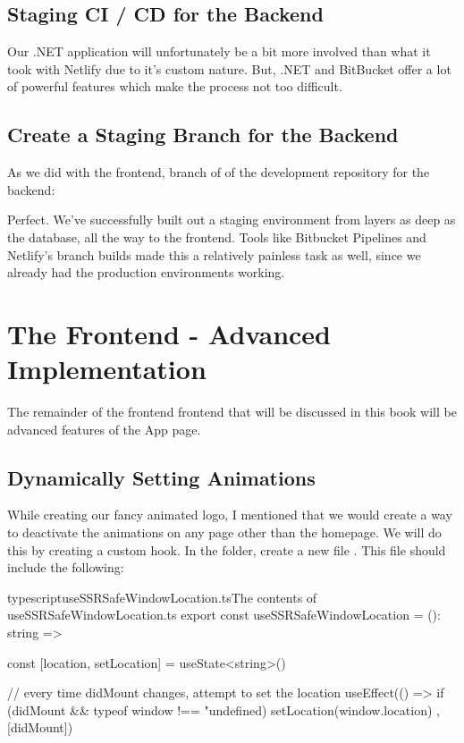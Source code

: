 \documentclass[paper=6in:9in,pagesize=pdftex,headinclude=on,footinclude=on,12pt]{scrbook}
\begin{document}
\section{Staging CI / CD for the Backend}

Our .NET application will unfortunately be a bit more involved than what it took with Netlify due to it's custom nature. But, .NET and BitBucket offer a lot of powerful features which make the process not too difficult.

\section{Create a Staging Branch for the Backend}

As we did with the frontend, branch of of the development repository for the backend:


Perfect. We've successfully built out a staging environment from layers as deep as the database, all the way to the frontend. Tools like Bitbucket Pipelines and Netlify's branch builds made this a relatively painless task as well, since we already had the production environments working.

\chapter{The Frontend - Advanced Implementation}

The remainder of the frontend frontend that will be discussed in this book will be advanced features of the App page. 

\section{Dynamically Setting Animations}

While creating our fancy animated logo, I mentioned that we would create a way to deactivate the animations on any page other than the homepage. We will do this by creating a custom hook. In the  folder, create a new file . This file should include the following:


\begin{codeInput}{typescript}{useSSRSafeWindowLocation.ts}{The contents of useSSRSafeWindowLocation.ts}
export const useSSRSafeWindowLocation = (): string => {
  const [location, setLocation] = useState<string>()

  // every time didMount changes, attempt to set the location
  useEffect(() => {
    if (didMount && typeof window !== "undefined) {
      setLocation(window.location)
    }
  },[didMount])
}
\end{codeInput}
\end{document}
